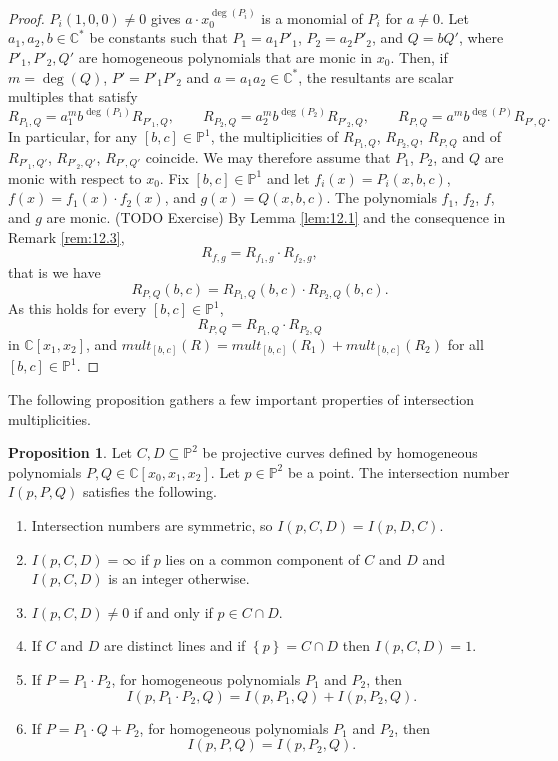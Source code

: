 \documentclass{article}
\newcommand{\C}{\mathbb{C}}
\renewcommand{\P}{\mathbb{P}}
\newcommand{\rb}[1]{\left( #1 \right)}
\renewcommand{\sb}[1]{\left[ #1 \right]}
\newcommand{\cb}[1]{\left\{ #1 \right\}}
\theoremstyle{definition}\newtheorem{definition}{Definition}[section]
\theoremstyle{definition}\newtheorem{notation}[definition]{Notation}
\theoremstyle{definition}\newtheorem{remark}[definition]{Remark}
\theoremstyle{definition}\newtheorem{example}[definition]{Example}
\theoremstyle{definition}\newtheorem{fact}{Fact}
\theoremstyle{definition}\newtheorem{exercise}{Exercise}
\newtheorem{proposition}[definition]{Proposition}
\begin{document}
\begin{proof}
$ P_i\rb{1, 0, 0} \ne 0 $ gives $ a \cdot x_0^{\deg\rb{P_i}} $ is a monomial of $ P_i $ for $ a \ne 0 $. Let $ a_1, a_2, b \in \C^* $ be constants such that $ P_1 = a_1P'_1 $, $ P_2 = a_2P'_2 $, and $ Q = bQ' $, where $ P'_1, P'_2, Q' $ are homogeneous polynomials that are monic in $ x_0 $. Then, if $ m = \deg\rb{Q} $, $ P' = P'_1P'_2 $ and $ a = a_1a_2 \in \C^* $, the resultants are scalar multiples that satisfy
$$ R_{P_1, Q} = a_1^mb^{\deg\rb{P_1}}R_{P'_1, Q}, \qquad R_{P_2, Q} = a_2^mb^{\deg\rb{P_2}}R_{P'_2, Q}, \qquad R_{P, Q} = a^mb^{\deg\rb{P}}R_{P', Q}. $$
In particular, for any $ \sb{b, c} \in \P^1 $, the multiplicities of $ R_{P_1, Q} $, $ R_{P_2, Q} $, $ R_{P, Q} $ and of $ R_{P'_1, Q'} $, $ R_{P'_2, Q'} $, $ R_{P', Q'} $ coincide. We may therefore assume that $ P_1 $, $ P_2 $, and $ Q $ are monic with respect to $ x_0 $. Fix $ \sb{b, c} \in \P^1 $ and let $ f_i\rb{x} = P_i\rb{x, b, c} $, $ f\rb{x} = f_1\rb{x} \cdot f_2\rb{x} $, and $ g\rb{x} = Q\rb{x, b, c} $. The polynomials $ f_1 $, $ f_2 $, $ f $, and $ g $ are monic. (TODO Exercise) By Lemma \ref{lem:12.1} and the consequence in Remark \ref{rem:12.3},
$$ R_{f, g} = R_{f_1, g} \cdot R_{f_2, g}, $$
that is we have
$$ R_{P, Q}\rb{b, c} = R_{P_1, Q}\rb{b, c} \cdot R_{P_2, Q}\rb{b, c}. $$
As this holds for every $ \sb{b, c} \in \P^1 $,
$$ R_{P, Q} =  R_{P_1, Q} \cdot R_{P_2, Q} $$
in $ \C\sb{x_1, x_2} $, and $ mult_{\sb{b, c}}\rb{R} = mult_{\sb{b, c}}\rb{R_1} + mult_{\sb{b, c}}\rb{R_2} $ for all $ \sb{b, c} \in \P^1 $.
\end{proof}

The following proposition gathers a few important properties of intersection multiplicities.

\begin{proposition}
\label{prop:12.5}
Let $ C, D \subseteq \P^2 $ be projective curves defined by homogeneous polynomials $ P, Q \in \C\sb{x_0, x_1, x_2} $. Let $ p \in \P^2 $ be a point. The intersection number $ I\rb{p, P, Q} $ satisfies the following.
\begin{enumerate}
\item Intersection numbers are symmetric, so $ I\rb{p, C, D} = I\rb{p, D, C} $.
\item $ I\rb{p, C, D} = \infty $ if $ p $ lies on a common component of $ C $ and $ D $ and $ I\rb{p, C, D} $ is an integer otherwise.
\item $ I\rb{p, C, D} \ne 0 $ if and only if $ p \in C \cap D $.
\item If $ C $ and $ D $ are distinct lines and if $ \cb{p} = C \cap D $ then $ I\rb{p, C, D} = 1 $.
\item If $ P = P_1 \cdot P_2 $, for homogeneous polynomials $ P_1 $ and $ P_2 $, then
$$ I\rb{p, P_1 \cdot P_2, Q} = I\rb{p, P_1, Q} + I\rb{p, P_2, Q}. $$
\item If $ P = P_1 \cdot Q + P_2 $, for homogeneous polynomials $ P_1 $ and $ P_2 $, then
$$ I\rb{p, P, Q} = I\rb{p, P_2, Q}. $$
\end{enumerate}
\end{proposition}
\end{document}
